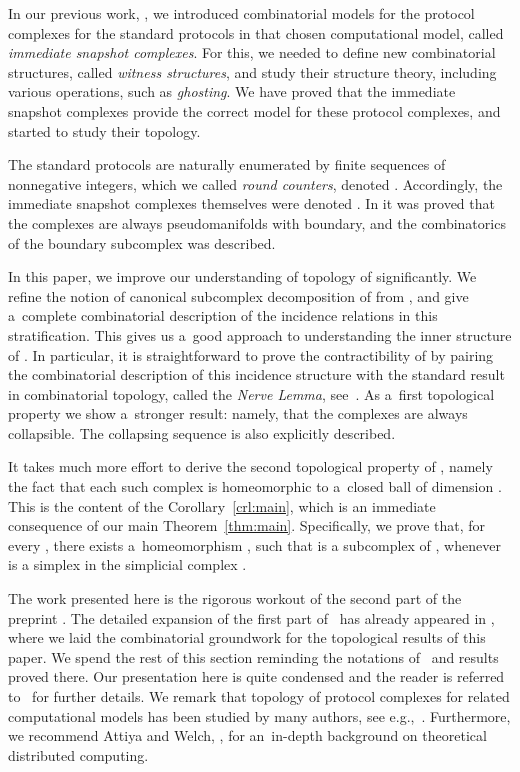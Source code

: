 \documentclass{amsart}[10pt]
\numberwithin{equation}{section}
\numberwithin{figure}{section}
\numberwithin{table}{section}
\begin{document}
In our previous work, \cite{k1}, we introduced combinatorial models
for the protocol complexes for the standard protocols in that chosen
computational model, called {\it immediate snapshot complexes}. For
this, we needed to define new combinatorial structures, called {\it
  witness structures}, and study their structure theory, including
various operations, such as {\it ghosting}. We have proved that the
immediate snapshot complexes provide the correct model for these
protocol complexes, and started to study their topology. 

The standard protocols are naturally enumerated by finite sequences of
nonnegative integers, which we called {\it round counters}, denoted
. Accordingly, the immediate snapshot complexes themselves were
denoted . In \cite{k1} it was proved that the complexes
 are always pseudomanifolds with boundary, and the
combinatorics of the boundary subcomplex was described.

In this paper, we improve our understanding of topology of 
significantly. We refine the notion of canonical subcomplex
decomposition of  from \cite{k1}, and give a~complete
combinatorial description of the incidence relations in this
stratification. This gives us a~good approach to understanding the
inner structure of . In particular, it is straightforward to
prove the contractibility of  by pairing the combinatorial
description of this incidence structure with the standard result in
combinatorial topology, called the {\it Nerve Lemma},
see~\cite{book}. As a~first topological property we show a~stronger
result: namely, that the complexes  are always
collapsible. The collapsing sequence is also explicitly described.

It takes much more effort to derive the second topological property
of , namely the fact that each such complex is homeomorphic to
a~closed ball of dimension . This is the content of the
Corollary~\ref{crl:main}, which is an immediate consequence of our
main Theorem~\ref{thm:main}. Specifically, we prove that, for every
, there exists a~homeomorphism , such that  is a subcomplex of ,
whenever  is a simplex in the simplicial complex
.

The work presented here is the rigorous workout of the second part of
the preprint \cite{kfull}. The detailed expansion of the first part
of~\cite{kfull} has already appeared in \cite{k1}, where we laid the
combinatorial groundwork for the topological results of this paper. We
spend the rest of this section reminding the notations of~\cite{k1}
and results proved there. Our presentation here is quite condensed and
the reader is referred to~\cite{k1} for further details. We remark
that topology of protocol complexes for related computational models
has been studied by many authors, see
e.g.,~\cite{Ha04,HKR,HS,subd,view}. Furthermore, we recommend Attiya
and Welch, \cite{AW}, for an~in-depth background on theoretical
distributed computing.
\end{document}
